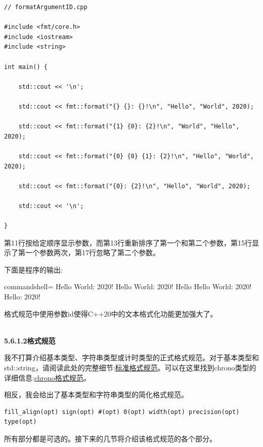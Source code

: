 \begin{lstlisting}[style=styleCXX]
// formatArgumentID.cpp

#include <fmt/core.h>
#include <iostream>
#include <string>

int main() {
	
	std::cout << '\n';
	
	std::cout << fmt::format("{} {}: {}!\n", "Hello", "World", 2020);
	
	std::cout << fmt::format("{1} {0}: {2}!\n", "World", "Hello", 2020);
	
	std::cout << fmt::format("{0} {0} {1}: {2}!\n", "Hello", "World", 2020);
	
	std::cout << fmt::format("{0}: {2}!\n", "Hello", "World", 2020);
	
	std::cout << '\n';

}
\end{lstlisting}

第11行按给定顺序显示参数，而第13行重新排序了第一个和第二个参数，第15行显示了第一个参数两次，第17行忽略了第二个参数。

下面是程序的输出:

\begin{tcblisting}{commandshell={}}
Hello World: 2020!
Hello World: 2020!
Hello Hello World: 2020!
Hello: 2020!
\end{tcblisting}

格式规范中使用参数id使得C++20中的文本格式化功能更加强大了。

\hspace*{\fill} \\ %
\noindent
\textbf{5.6.1.2\hspace{0.2cm}格式规范}

我不打算介绍基本类型、字符串类型或计时类型的正式格式规范。对于基本类型和std::string，请阅读此处的完整细节:\href{https://en.cppreference.com/w/cpp/utility/format/formatter#Standard_format_specification}{标准格式规范}。可以在这里找到chrono类型的详细信息:\href{https://en.cppreference.com/w/cpp/chrono/system_clock/formatter#Format_specification}{chrono格式规范}。

相反，我会给出了基本类型和字符串类型的简化格式规范。

\begin{lstlisting}[style=styleCXX]
fill_align(opt) sign(opt) #(opt) 0(opt) width(opt) precision(opt) type(opt)
\end{lstlisting}

所有部分都是可选的。接下来的几节将介绍该格式规范的各个部分。

